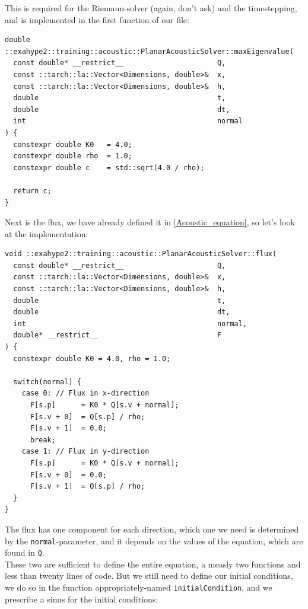 \documentclass[12pt,letterpaper]{article}
\begin{document}
This is required for the Riemann-solver (again, don't ask) and the timestepping, and is implemented in the first function of our file:\\

\begin{lstlisting}[style = C++]
double ::exahype2::training::acoustic::PlanarAcousticSolver::maxEigenvalue(
  const double* __restrict__                      Q,
  const ::tarch::la::Vector<Dimensions, double>&  x,
  const ::tarch::la::Vector<Dimensions, double>&  h,
  double                                          t,
  double                                          dt,
  int                                             normal
) {
  constexpr double K0   = 4.0;
  constexpr double rho  = 1.0;
  constexpr double c    = std::sqrt(4.0 / rho);

  return c;
}
\end{lstlisting}

\newpage

Next is the flux, we have already defined it in \ref{Acoustic_equation}, so let's look at the implementation:\\

\begin{lstlisting}[style = C++]
void ::exahype2::training::acoustic::PlanarAcousticSolver::flux(
  const double* __restrict__                      Q,
  const ::tarch::la::Vector<Dimensions, double>&  x,
  const ::tarch::la::Vector<Dimensions, double>&  h,
  double                                          t,
  double                                          dt,
  int                                             normal,
  double* __restrict__                            F
) {
  constexpr double K0 = 4.0, rho = 1.0;

  switch(normal) {
    case 0: // Flux in x-direction
      F[s.p]      = K0 * Q[s.v + normal];
      F[s.v + 0]  = Q[s.p] / rho;
      F[s.v + 1]  = 0.0;
      break;
    case 1: // Flux in y-direction
      F[s.p]      = K0 * Q[s.v + normal];
      F[s.v + 0]  = 0.0;
      F[s.v + 1]  = Q[s.p] / rho;
  }
}
\end{lstlisting}

The flux has one component for each direction, which one we need is determined by the \texttt{normal}-parameter,
and it depends on the values of the equation, which are found in \texttt{Q}.\\
These two are sufficient to define the entire equation, a measly two functions and less than twenty lines of code.
But we still need to define our initial conditions, we do so in the function appropriately-named \texttt{initialCondition},
and we prescribe a sinus for the initial conditions:\\
\end{document}
